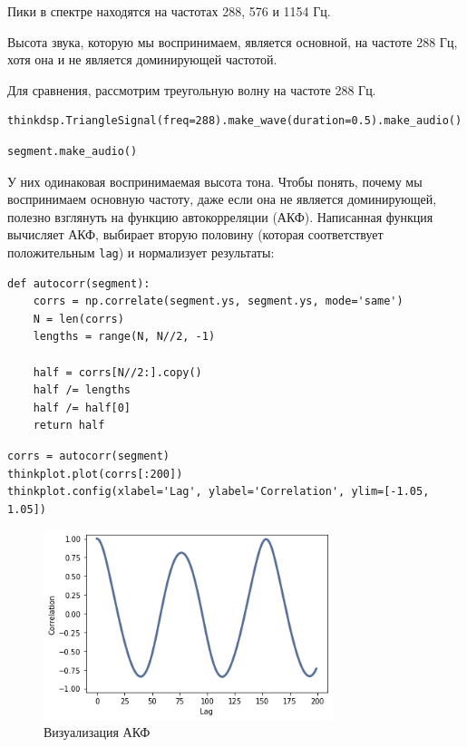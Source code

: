 \documentclass[a4paper,12pt]{report}
\begin{document}
Пики в спектре находятся на частотах 288, 576 и 1154 Гц.

Высота звука, которую мы воспринимаем, является основной, на частоте 288 Гц, хотя она и не является доминирующей частотой.

Для сравнения, рассмотрим треугольную волну на частоте 288 Гц.

\begin{lstlisting}[caption=Треугольная волна]
thinkdsp.TriangleSignal(freq=288).make_wave(duration=0.5).make_audio()
\end{lstlisting}

\begin{lstlisting}[caption=Сегмент звука]
segment.make_audio()
\end{lstlisting}

У них одинаковая воспринимаемая высота тона. Чтобы понять, почему мы воспринимаем основную частоту, даже если она не является доминирующей, полезно взглянуть на функцию автокорреляции (АКФ). Написанная функция вычисляет АКФ, выбирает вторую половину (которая соответствует положительным \texttt{lag}) и нормализует результаты:

\begin{lstlisting}[caption=Функция \texttt{autocorr}]
def autocorr(segment):
    corrs = np.correlate(segment.ys, segment.ys, mode='same')
    N = len(corrs)
    lengths = range(N, N//2, -1)

    half = corrs[N//2:].copy()
    half /= lengths
    half /= half[0]
    return half
\end{lstlisting}

\begin{lstlisting}[caption=Визуализация АКФ]
corrs = autocorr(segment)
thinkplot.plot(corrs[:200])
thinkplot.config(xlabel='Lag', ylabel='Correlation', ylim=[-1.05, 1.05])
\end{lstlisting}

\begin{figure}[H]
        \centering
        \includegraphics[width=0.75\textwidth]{lab5_fig4_3.png}
        \caption{Визуализация АКФ}
        \label{fig:lab5_fig4_3}
\end{figure}
\end{document}
